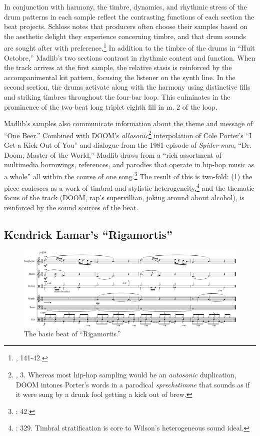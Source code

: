 In conjunction with harmony, the timbre, dynamics, and rhythmic stress of the drum patterns in each sample reflect the contrasting functions of each section the beat projects. Schloss notes that producers often choose their samples based on the aesthetic delight they experience concerning timbre, and that drum sounds are sought after with preference.\footnote{\cite{josephgschlossMakingBeatsArt2004}, 141-42.} In addition to the timbre of the drums in ``Huit Octobre,'' Madlib's two sections contrast in rhythmic content and function. When the track arrives at the first sample, the relative stasis is reinforced by the accompanimental kit pattern, focusing the listener on the synth line. In the second section, the drums activate along with the harmony using distinctive fills and striking timbres throughout the four-bar loop. This culminates in the prominence of the two-beat long triplet eighth fill in m. 2 of the loop.

Madlib's samples also communicate information about the theme and message of ``One Beer.'' Combined with DOOM's \emph{allosonic}\footnote{\cite{justinawilliamsRhyminStealinMusical2013}, 3. Whereas most hip-hop sampling would be an \emph{autosonic} duplication, DOOM intones Porter's words in a parodical \textit{sprechstimme} that sounds as if it were sung by a drunk fool getting a kick out of brew.} interpolation of Cole Porter's ``I Get a Kick Out of You'' and dialogue from the 1981 episode of \textit{Spider-man}, ``Dr. Doom, Master of the World,'' Madlib draws from a ``rich assortment of multimedia borrowings, references, and parodies that operate in hip-hop music as a whole'' all within the course of one song.\footnote{\cite{joannademersSampling1970sHipHop2003}: 42.} The result of this is two-fold: (1) the piece coalesces as a work of timbral and stylistic heterogeneity,\footnote{\cite{ollywilsonHeterogeneousSoundIdeal1992}: 329. Timbral stratification is core to Wilson's heterogeneous sound ideal.} and the thematic focus of the track (DOOM, rap's supervillian, joking around about alcohol), is reinforced by the sound sources of the beat.

\subsection*{\centering Kendrick Lamar's ``Rigamortis''}

    \begin{figure}[ht]
        \centering
        \includegraphics[width=\textwidth]{images/figures/chp 02/Figure-02.3-Rigamortis-BB.pdf}
        \caption{The basic beat of ``Rigamortis.''}
        \label{fig:2.1}
    \end{figure}

